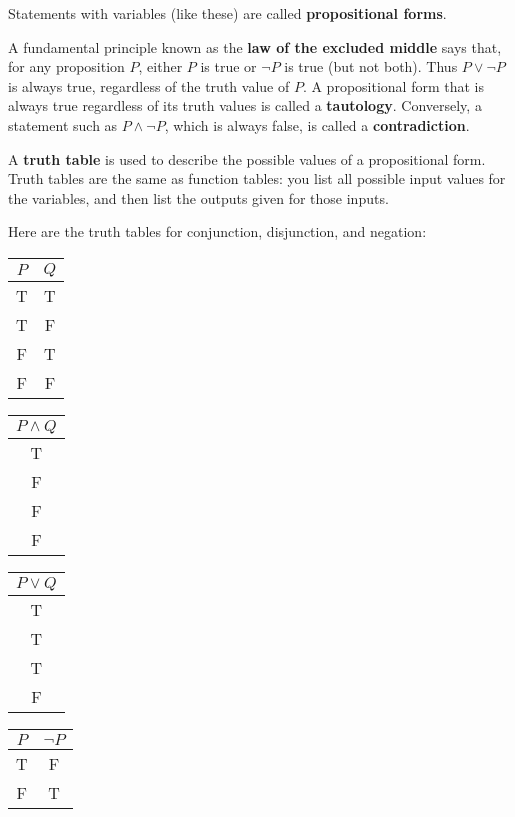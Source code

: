 \documentclass[12pt,a4paper]{article}
\begin{document}
Statements with variables (like these) are called \textbf{propositional forms}.

\bigbreak

A fundamental principle known as the \textbf{law of the excluded middle} says that, for any proposition $P$, either $P$ is true or $\neg P$ is true (but not both). Thus $P\vee\neg P$ is always true, regardless of the truth value of $P$. A propositional form that is always true regardless of its truth values is called a \textbf{tautology}. Conversely, a statement such as $P\wedge\neg P$, which is always false, is called a \textbf{contradiction}.

\bigbreak

A \textbf{truth table} is used to describe the possible values of a propositional form. Truth tables are the same as function tables: you list all possible input values for the variables, and then list the outputs given for those inputs.

\bigbreak

Here are the truth tables for conjunction, disjunction, and negation:
\begin{center}
	\begin{tabular}{ |c|c| }
		\hline
		$P$ & $Q$ \\
		\hline
		T & T \\
		\hline
		T & F \\ 
		\hline
		F & T \\ 
		\hline
		F & F \\
		\hline
	\end{tabular}
	\begin{tabular}{ |c| }
		\hline
		$P\wedge Q$ \\
		\hline
		T \\
		\hline
		F \\
		\hline
		F \\
		\hline
		F \\
		\hline
	\end{tabular}
	\begin{tabular}{ |c| }
		\hline
		$P\vee Q$ \\
		\hline
		T \\
		\hline
		T \\
		\hline
		T \\
		\hline
		F \\
		\hline
	\end{tabular}
	\begin{tabular}{ |c|c| }
		\hline
		$P$ & $\neg P$ \\
		\hline
		T & F \\
		\hline
		F & T \\
		\hline		
	\end{tabular}
\end{center}
\end{document}
